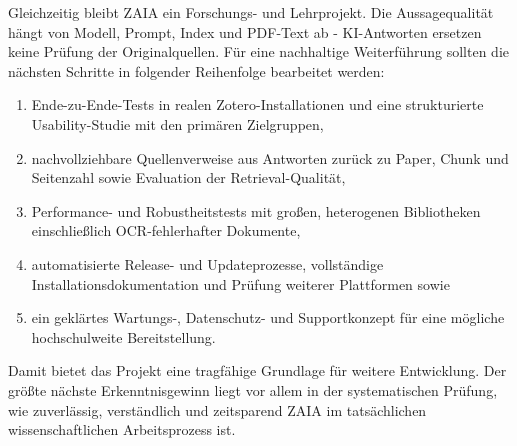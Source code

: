 \documentclass[11pt,a4paper,oneside,parskip=half]{scrartcl}
\begin{document}
Gleichzeitig bleibt ZAIA ein Forschungs- und Lehrprojekt. Die Aussagequalität
hängt von Modell, Prompt, Index und PDF-Text ab - KI-Antworten ersetzen keine
Prüfung der Originalquellen. Für eine nachhaltige Weiterführung sollten die
nächsten Schritte in folgender Reihenfolge bearbeitet werden:
\begin{enumerate}
  \item Ende-zu-Ende-Tests in realen Zotero-Installationen und eine strukturierte
    Usability-Studie mit den primären Zielgruppen,
  \item nachvollziehbare Quellenverweise aus Antworten zurück zu Paper, Chunk
    und Seitenzahl sowie Evaluation der Retrieval-Qualität,
  \item Performance- und Robustheitstests mit großen, heterogenen Bibliotheken
    einschließlich OCR-fehlerhafter Dokumente,
  \item automatisierte Release- und Updateprozesse, vollständige
    Installationsdokumentation und Prüfung weiterer Plattformen sowie
  \item ein geklärtes Wartungs-, Datenschutz- und Supportkonzept für eine
    mögliche hochschulweite Bereitstellung.
\end{enumerate}

Damit bietet das Projekt eine tragfähige Grundlage für weitere Entwicklung. Der
größte nächste Erkenntnisgewinn liegt vor allem in der systematischen
Prüfung, wie zuverlässig, verständlich und
zeitsparend ZAIA im tatsächlichen wissenschaftlichen Arbeitsprozess ist.
\end{document}
